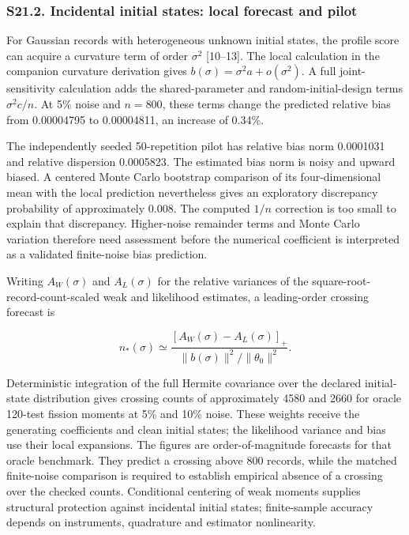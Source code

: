 \documentclass[
  american,
  11pt,
]{article}
\begin{document}
\subsubsection{S21.2. Incidental initial states: local forecast and
pilot}\label{s21.2.-incidental-initial-states-local-forecast-and-pilot}

For Gaussian records with heterogeneous unknown initial states, the
profile score can acquire a curvature term of order \(\sigma^2\)
{[}10--13{]}. The local calculation in the companion curvature
derivation gives \(b(\sigma)=\sigma^2 a+o(\sigma^2)\). A full
joint-sensitivity calculation adds the shared-parameter and
random-initial-design terms \(\sigma^2 c/n\). At 5\% noise and
\(n=800\), these terms change the predicted relative bias from
0.00004795 to 0.00004811, an increase of 0.34\%.

The independently seeded 50-repetition pilot has relative bias norm
0.0001031 and relative dispersion 0.0005823. The estimated bias norm is
noisy and upward biased. A centered Monte Carlo bootstrap comparison of
its four-dimensional mean with the local prediction nevertheless gives
an exploratory discrepancy probability of approximately 0.008. The
computed \(1/n\) correction is too small to explain that discrepancy.
Higher-noise remainder terms and Monte Carlo variation therefore need
assessment before the numerical coefficient is interpreted as a
validated finite-noise bias prediction.

Writing \(A_W(\sigma)\) and \(A_L(\sigma)\) for the relative variances
of the square-root-record-count-scaled weak and likelihood estimates, a
leading-order crossing forecast is

\[
n_*(\sigma)\simeq\frac{[A_W(\sigma)-A_L(\sigma)]_+}{\|b(\sigma)\|^2/\|\theta_0\|^2}.
\]

Deterministic integration of the full Hermite covariance over the
declared initial-state distribution gives crossing counts of
approximately 4580 and 2660 for oracle 120-test fission moments at 5\%
and 10\% noise. These weights receive the generating coefficients and
clean initial states; the likelihood variance and bias use their local
expansions. The figures are order-of-magnitude forecasts for that oracle
benchmark. They predict a crossing above 800 records, while the matched
finite-noise comparison is required to establish empirical absence of a
crossing over the checked counts. Conditional centering of weak moments
supplies structural protection against incidental initial states;
finite-sample accuracy depends on instruments, quadrature and estimator
nonlinearity.
\end{document}
